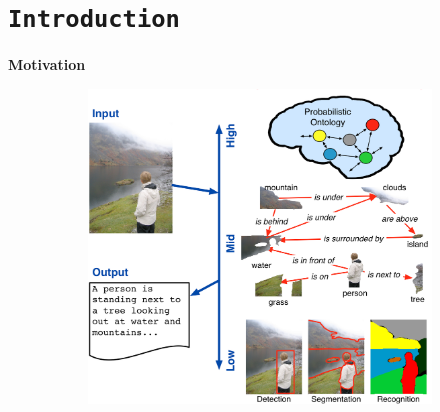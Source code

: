 \section{\texttt{Introduction}}
\begin{frame}{\textbf{Motivation}}
\begin{figure}
	\centering
	\begin{subfigure}[c]{0.3\textwidth}
		\includegraphics[width=\textwidth]{./img/motivation1.png} \footnotemark
    \end{subfigure}\hspace{3em}%
    \begin{subfigure}[c]{0.2\textwidth}

\end{subfigure}
\end{figure}
\end{frame}
